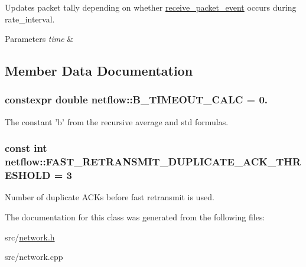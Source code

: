 Updates packet tally depending on whether {\ttfamily \hyperlink{classreceive__packet__event}{receive\-\_\-packet\-\_\-event}} occurs during rate\-\_\-interval. 


\begin{DoxyParams}{Parameters}
{\em time} & \\
\hline
\end{DoxyParams}


\subsection{Member Data Documentation}
\hypertarget{classnetflow_a0461fac67c5f304973461a1644b58dd3}{
\subsubsection[{B\-\_\-\-T\-I\-M\-E\-O\-U\-T\-\_\-\-C\-A\-L\-C}]{\setlength{\rightskip}{0pt plus 5cm}constexpr double netflow\-::\-B\-\_\-\-T\-I\-M\-E\-O\-U\-T\-\_\-\-C\-A\-L\-C = 0.\hspace{0.3cm}{\ttfamily [static]}}}\label{classnetflow_a0461fac67c5f304973461a1644b58dd3}


The constant 'b' from the recursive average and std formulas. 

\hypertarget{classnetflow_ace7122626410ab50fbe69dcc0f77dcb0}{
\subsubsection[{F\-A\-S\-T\-\_\-\-R\-E\-T\-R\-A\-N\-S\-M\-I\-T\-\_\-\-D\-U\-P\-L\-I\-C\-A\-T\-E\-\_\-\-A\-C\-K\-\_\-\-T\-H\-R\-E\-S\-H\-O\-L\-D}]{\setlength{\rightskip}{0pt plus 5cm}const int netflow\-::\-F\-A\-S\-T\-\_\-\-R\-E\-T\-R\-A\-N\-S\-M\-I\-T\-\_\-\-D\-U\-P\-L\-I\-C\-A\-T\-E\-\_\-\-A\-C\-K\-\_\-\-T\-H\-R\-E\-S\-H\-O\-L\-D = 3\hspace{0.3cm}{\ttfamily [static]}}}\label{classnetflow_ace7122626410ab50fbe69dcc0f77dcb0}


Number of duplicate A\-C\-Ks before fast retransmit is used. 



The documentation for this class was generated from the following files\-:\begin{DoxyCompactItemize}
\item 
src/\hyperlink{network_8h}{network.\-h}\item 
src/network.\-cpp\end{DoxyCompactItemize}
